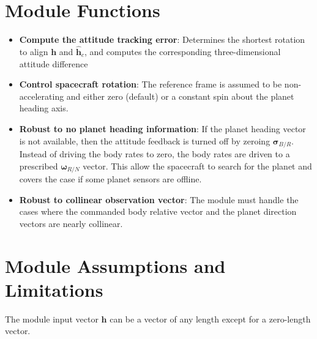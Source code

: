 

\section{Module Functions}
\begin{itemize}
	\item \textbf{Compute the attitude tracking error}: Determines the shortest rotation to align $\bm h$ and $\hat{\bm h}_{c}$, and computes the corresponding three-dimensional attitude difference
	\item \textbf{Control spacecraft rotation}: The reference frame is assumed to be non-accelerating and either zero (default) or a constant spin about the planet heading axis.
	
	\item \textbf{Robust to no planet heading information}: If the planet heading vector is not available, then the attitude feedback is turned off by zeroing $\bm\sigma_{B/R}$.  Instead of driving the body rates to zero, the body rates are driven to a prescribed $\bm\omega_{R/N}$ vector.  This allow the spacecraft to search for the planet and covers the case if some planet sensors are offline.  
	
	\item \textbf{Robust to collinear observation vector}:  The module must handle the cases where the commanded body relative vector and the planet direction vectors are nearly collinear. 
\end{itemize}

\section{Module Assumptions and Limitations}
The module input vector $\bm h$ can be a vector of any length except for a zero-length vector.  %